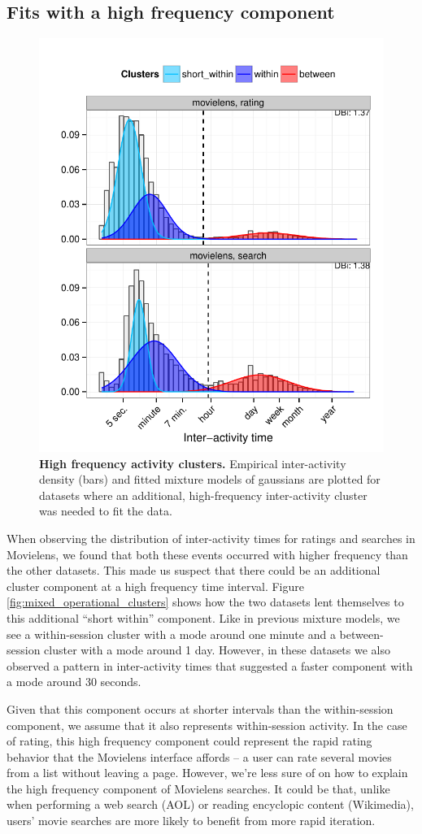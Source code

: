 \subsection{Fits with a high frequency component}
\begin{figure}
\centering
\includegraphics[width=.45\textwidth]{figures/operation_mixed_clusters.pdf}
\caption{
    \textbf{High frequency activity clusters.} Empirical inter-activity density (bars) and fitted mixture models of gaussians are plotted for datasets where an additional, high-frequency inter-activity cluster was needed to fit the data.
}
\end{figure}
When observing the distribution of inter-activity times for ratings and searches in Movielens, we found that both these events occurred with higher frequency than the other datasets.  This made us suspect that there could be an additional cluster component at a high frequency time interval.  Figure \ref{fig:mixed_operational_clusters} shows how the two datasets lent themselves to this additional ``short within'' component.  Like in previous mixture models, we see a within-session cluster with a mode around one minute and a between-session cluster with a mode around 1 day.  However, in these datasets we also observed a pattern in inter-activity times that suggested a faster component with a mode around 30 seconds.

Given that this component occurs at shorter intervals than the within-session component, we assume that it also represents within-session activity.  In the case of rating, this high frequency component could represent the rapid rating behavior that the Movielens interface affords -- a user can rate several movies from a list without leaving a page.  However, we're less sure of on how to explain the high frequency component of Movielens searches.  It could be that, unlike when performing a web search (AOL) or reading encyclopic content (Wikimedia), users' movie searches are more likely to benefit from more rapid iteration.


